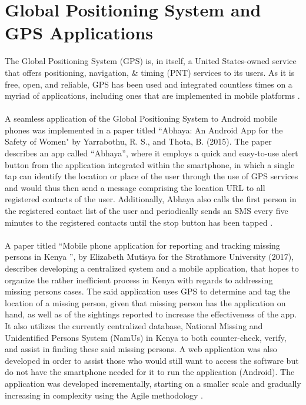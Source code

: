 \section{Global Positioning System and GPS Applications}

The Global Positioning System (GPS) is, in itself, a United States-owned service that offers positioning, navigation, & timing (PNT) services to its users. As it is free, open, and reliable, GPS has been used and integrated countless times on a myriad of applications, including ones that are implemented in mobile platforms \cite{gpsGov}.
\\\\A seamless application of the Global Positioning System to Android mobile phones was implemented in a paper titled “Abhaya: An Android App for the Safety of Women" by Yarrabothu, R. S., and Thota, B. (2015). The paper describes an app called “Abhaya”, where it employs a quick and easy-to-use alert button from the application integrated within the smartphone, in which a single tap can identify the location or place of the user through the use of GPS services and would thus then send a message comprising the location URL to all registered contacts of the user. Additionally, Abhaya also calls the first person in the registered contact list of the user and periodically sends an SMS every five minutes to the registered contacts until the stop button has been tapped \cite{yarrabothu2015abhaya}.
\\\\A paper titled “Mobile phone application for reporting and tracking missing persons in Kenya ”, by Elizabeth Mutisya for the Strathmore University (2017), describes developing a centralized system and a mobile application, that hopes to organize the rather inefficient process in Kenya with regards to addressing missing persons cases. The said application uses GPS to determine and tag the location of a missing person, given that missing person has the application on hand, as well as of the sightings reported to increase the effectiveness of the app. It also utilizes the currently centralized database, National Missing and Unidentified Persons System (NamUs) in Kenya to both counter-check, verify, and assist in finding these said missing persons. A web application was also developed in order to assist those who would still want to access the software but do not have the smartphone needed for it to run the application (Android). The application was developed incrementally, starting on a smaller scale and gradually increasing in complexity using the Agile methodology \cite{mutisya2017mobile}.
